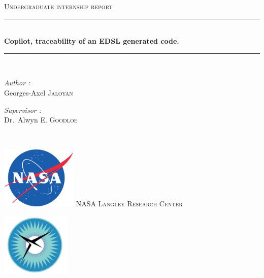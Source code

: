 \documentclass[a4paper,11pt,final]{article}
\newcommand{\reporttitle}{Copilot, traceability of an EDSL generated code.}     %
\newcommand{\reportauthor}{Georges-Axel \textsc{Jaloyan}} %
\newcommand{\reportsubject}{Undergraduate internship report} %
\newcommand{\HRule}{\rule{\linewidth}{0.5mm}}
\begin{document}
	
	\begin{titlepage}
		
		\begin{center}
			
			
			\textsc{\Large \reportsubject}\\[0.5cm]
			\HRule \\[0.4cm]
			{\huge \bfseries \reporttitle}\\[0.4cm]
			\HRule \\[1.5cm]
			
			\begin{minipage}[t]{0.3\textwidth}
				\begin{flushleft} \large
					\emph{Author :}\\
					\reportauthor
				\end{flushleft}
			\end{minipage}
			\begin{minipage}[t]{0.6\textwidth}
				\begin{flushright} \large
					\emph{Supervisor :} \\
					Dr.~Alwyn \textsc{E. Goodloe}
				\end{flushright}
			\end{minipage}
			\\[1.5cm]
			\begin{minipage}[t]{0.25\textwidth}
				\begin{flushleft}
					\includegraphics[height=30mm]{images/NASA.png}	
					\textsc{\LARGE NASA Langley Research Center}
				\end{flushleft}
			\end{minipage}
			\begin{minipage}[t]{0.25\textwidth}
				\begin{flushleft}
					\includegraphics[height=30mm]{images/NIA-logo.jpg}

\end{flushleft}
\end{minipage}
\end{center}
\end{titlepage}
\end{document}
